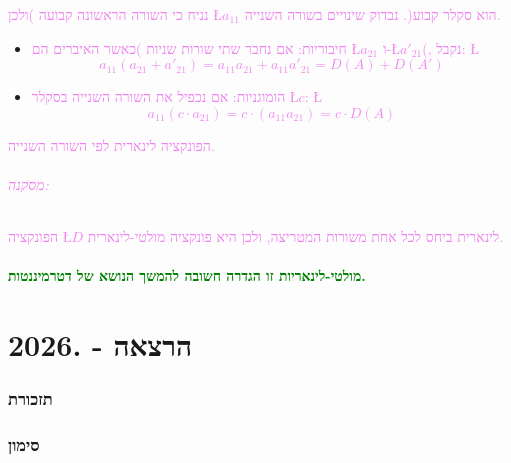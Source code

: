 \documentclass[english,hebrew]{article}
\begin{document}
\textcolor{violet}{נניח כי השורה הראשונה קבועה )ולכן \L{$a_{11}$}
הוא סקלר קבוע(. נבדוק שינויים בשורה השנייה. }
\begin{itemize}
\item \textcolor{violet}{חיבוריות: אם נחבר שתי שורות שניות )כאשר האיברים
הם \L{$a_{21}$} ו-\L{$a'_{21}$}(, נקבל: \L{%
\[
a_{11}(a_{21}+a'_{21})=a_{11}a_{21}+a_{11}a'_{21}=D(A)+D(A')
\]
}%
}
\item \textcolor{violet}{הומוגניות: אם נכפיל את השורה השנייה בסקלר \L{$c$}:
\L{%
\[
a_{11}(c\cdot a_{21})=c\cdot(a_{11}a_{21})=c\cdot D(A)
\]
}%
}
\end{itemize}
\textcolor{violet}{הפונקציה לינארית לפי השורה השנייה.}

\paragraph*{\textcolor{violet}{מסקנה:}}

\textcolor{violet}{הפונקציה \L{$D$} לינארית ביחס לכל אחת משורות המטריצה,
ולכן היא פונקציה מולטי-לינארית.}\textcolor{gray}{}\\
\textcolor{gray}{}\\
\textbf{\textcolor{green}{מולטי-לינאריות זו הגדרה חשובה להמשך הנושא
של דטרמיננטות.}}

\newpage{}

\noindent{}

\part{הרצאה {\endL} - {.2026\endL}}

\section{תזכורת}

\section{סימון}
\end{document}
